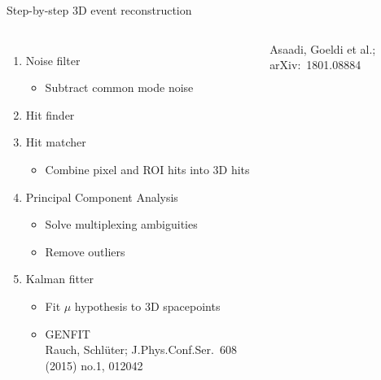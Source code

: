 \documentclass[]{beamer}
\begin{document}
\begin{frame}{Step-by-step 3D event reconstruction}{}
	\begin{columns}[c]
		\begin{enumerate}
			\item<1-> Noise filter
			\begin{itemize}
				\item Subtract common mode noise
			\end{itemize}
			\item<2-> Hit finder
			\item<2-> Hit matcher
			\begin{itemize}
				\item Combine pixel and ROI hits into 3D hits
			\end{itemize}
			\item<3-> Principal Component Analysis
			\begin{itemize}
				\item Solve multiplexing ambiguities
				\item Remove outliers
			\end{itemize}
			\item<4-> Kalman fitter
			\begin{itemize}
				\item Fit $\mu$ hypothesis to 3D spacepoints
				\item GENFIT\\{\tiny Rauch, Schlüter; J.Phys.Conf.Ser.\ 608 (2015) no.1, 012042~\cite{genfit2}}
			\end{itemize}
		\end{enumerate}
		{\tiny Asaadi, Goeldi et al.; arXiv:~1801.08884~\cite{pixel_paper}}\\
		\centering

\end{columns}
\end{frame}
\end{document}
